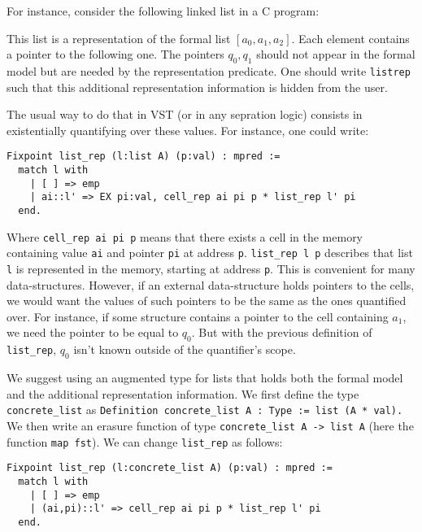 For instance, consider the following linked list in a C program:

\begin{center}
\end{center}

This list is a representation of the formal list $[a_0,a_1,a_2]$.
Each element contains a pointer to the following one.
The pointers $q_0, q_1$ should not appear in the formal model but are needed by the representation predicate.
One should write \lstinline{listrep} such that this additional representation information is hidden from the user.

The usual way to do that in VST (or in any sepration logic) consists in existentially quantifying over these values.
For instance, one could write:
\begin{lstlisting}[language=Coq]
Fixpoint list_rep (l:list A) (p:val) : mpred :=
  match l with
    | [ ] => emp
    | ai::l' => EX pi:val, cell_rep ai pi p * list_rep l' pi
  end.
\end{lstlisting}

Where \lstinline{cell_rep ai pi p} means that there exists a cell in the memory containing value \texttt{ai} and pointer \texttt{pi} at address \texttt{p}.
\lstinline{list_rep l p} describes that list \texttt{l} is represented in the memory, starting at address \texttt{p}. This is convenient for many data-structures.
However, if an external data-structure holds pointers to the cells, we would want the values of such pointers to be the same as the ones quantified over.
For instance, if some structure contains a pointer to the cell containing $a_1$, we need the pointer to be equal to $q_0$.
But with the previous definition of \lstinline{list_rep}, $q_0$ isn't known outside of the quantifier's scope.

We suggest using an augmented type for lists that holds both the formal model and the additional representation information.
We first define the type \lstinline{concrete_list} as
\lstinline[language=Coq]{Definition concrete_list A : Type := list (A * val).}
We then write an erasure function of type \lstinline[language=Coq]{concrete_list A -> list A} (here the function \lstinline[language=Coq]{map fst}).
We can change \lstinline[language=Coq]{list_rep} as follows:
\begin{lstlisting}[language=Coq]
Fixpoint list_rep (l:concrete_list A) (p:val) : mpred :=
  match l with
    | [ ] => emp
    | (ai,pi)::l' => cell_rep ai pi p * list_rep l' pi
  end.
\end{lstlisting}

